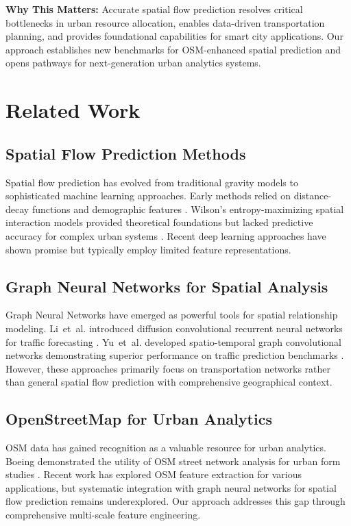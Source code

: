 \documentclass[twocolumn,11pt]{IEEEtran}  %
\begin{document}
\textbf{Why This Matters:} Accurate spatial flow prediction resolves critical bottlenecks in urban resource allocation, enables data-driven transportation planning, and provides foundational capabilities for smart city applications. Our approach establishes new benchmarks for OSM-enhanced spatial prediction and opens pathways for next-generation urban analytics systems.

\section{Related Work}

\subsection{Spatial Flow Prediction Methods}
Spatial flow prediction has evolved from traditional gravity models to sophisticated machine learning approaches. Early methods relied on distance-decay functions and demographic features \cite{flowml1}. Wilson's entropy-maximizing spatial interaction models provided theoretical foundations but lacked predictive accuracy for complex urban systems \cite{wilson1967}. Recent deep learning approaches have shown promise but typically employ limited feature representations.

\subsection{Graph Neural Networks for Spatial Analysis}
Graph Neural Networks have emerged as powerful tools for spatial relationship modeling. Li~et~al. introduced diffusion convolutional recurrent neural networks for traffic forecasting \cite{li2018}. Yu~et~al. developed spatio-temporal graph convolutional networks demonstrating superior performance on traffic prediction benchmarks \cite{yu2018}. However, these approaches primarily focus on transportation networks rather than general spatial flow prediction with comprehensive geographical context.

\subsection{OpenStreetMap for Urban Analytics}
OSM data has gained recognition as a valuable resource for urban analytics. Boeing demonstrated the utility of OSM street network analysis for urban form studies \cite{boeing2017}. Recent work has explored OSM feature extraction for various applications, but systematic integration with graph neural networks for spatial flow prediction remains underexplored. Our approach addresses this gap through comprehensive multi-scale feature engineering.
\end{document}
